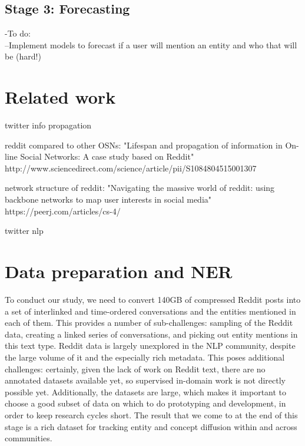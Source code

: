 \documentclass[journal,10pt,draftclsnofoot,onecolumn]{IEEEtran}
\begin{document}
\subsection{Stage 3: Forecasting}
-To do:\\
--Implement models to forecast if a user will mention an entity and who that will be (hard!)



\section{Related work}

twitter info propagation

reddit compared to other OSNs: "Lifespan and propagation of information in On-line Social Networks: A case study based on Reddit"  http://www.sciencedirect.com/science/article/pii/S1084804515001307

network structure of reddit: "Navigating the massive world of reddit: using backbone networks to map user interests in social media" https://peerj.com/articles/cs-4/

twitter nlp


\section{Data preparation and NER}

To conduct our study, we need to convert 140GB of compressed Reddit posts into a set of interlinked and time-ordered conversations and the entities mentioned in each of them.
This provides a number of sub-challenges: sampling of the Reddit data, creating a linked series of conversations, and picking out entity mentions in this text type.
Reddit data is largely unexplored in the NLP community, despite the large volume of it and the especially rich metadata.
This poses additional challenges: certainly, given the lack of work on Reddit text, there are no annotated datasets available yet, so supervised in-domain work is not directly possible yet.
Additionally, the datasets are large, which makes it important to choose a good subset of data on which to do prototyping and development, in order to keep research cycles short.
The result that we come to at the end of this stage is a rich dataset for tracking entity and concept diffusion within and across communities.
\end{document}
